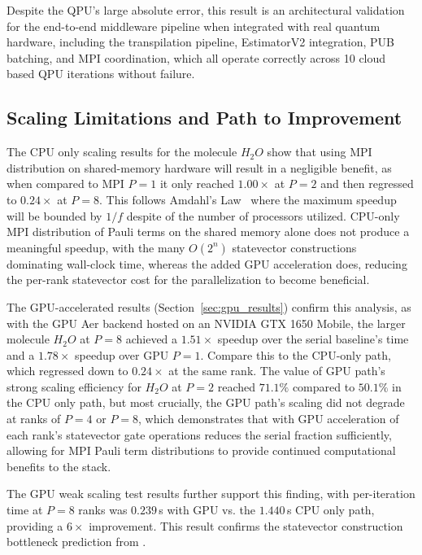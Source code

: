 Despite the QPU's large absolute error, this result is an architectural validation for the end-to-end middleware pipeline when integrated with 
real quantum hardware, including the transpilation pipeline, EstimatorV2 integration, PUB batching, and MPI coordination, which all operate correctly across 10 cloud based QPU iterations without failure.

\subsection{Scaling Limitations and Path to Improvement}
The CPU only scaling results for the molecule $H_{2}O$ show that using MPI distribution on shared-memory hardware will result in a negligible 
benefit, as when compared to MPI $P=1$ it only reached $1.00\times$ at $P=2$ and then regressed to $0.24\times$ at $P=8$. This follows 
Amdahl's Law~\parencite{amdahl1967validity} where the maximum speedup will be bounded by $1/f$ despite of the number of processors utilized. CPU-only MPI
distribution of Pauli terms on the shared memory alone does not produce a meaningful speedup, with the many $O(2^n)$ statevector constructions dominating wall-clock time, whereas the added GPU acceleration does, reducing the per-rank statevector cost for the parallelization to become beneficial.

The GPU-accelerated results (Section~\ref{sec:gpu_results}) confirm this analysis, as with the GPU Aer backend hosted on an 
NVIDIA GTX 1650 Mobile, the larger molecule $H_{2}O$ at $P=8$ achieved a $1.51\times$ speedup over the serial baseline's time and a $1.78\times$ 
speedup over GPU $P=1$. Compare this to the CPU-only path, which regressed down to $0.24\times$ at the same rank. 
The value of GPU path's strong scaling efficiency for $H_{2}O$ at $P=2$ reached $71.1\%$ compared to $50.1\%$ in the CPU only path, 
but most crucially, the GPU path's scaling did not degrade at ranks of $P=4$ or $P=8$, which demonstrates that with GPU acceleration of each rank's 
statevector gate operations reduces the serial fraction sufficiently, allowing for MPI Pauli term distributions to provide continued computational benefits to the stack.

The GPU weak scaling test results further support this finding, with per-iteration time at $P=8$ ranks was $0.239$\,s with GPU vs. the $1.440$\,s CPU only path, providing 
a $6\times$ improvement. This result confirms the statevector construction bottleneck prediction from \textcite{bayraktar2023cuquantum}.

